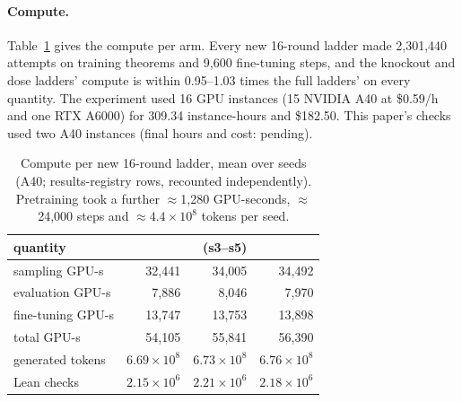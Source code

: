 \paragraph{Compute.} Table~\ref{tab:compute} gives the compute per arm. Every new 16-round ladder made 2,301,440 attempts
on training theorems and 9,600 fine-tuning steps, and the knockout and dose ladders' compute is within 0.95--1.03 times
the full ladders' on every quantity. The experiment used 16 GPU instances (15 NVIDIA A40 at \$0.59/h and one RTX A6000)
for 309.34 instance-hours and \$182.50. This paper's checks used two A40 instances (final hours and cost: pending).

\begin{table}[h]
\centering\small
\caption{Compute per new 16-round ladder, mean over seeds (A40; results-registry rows, recounted independently).
Pretraining took a further $\approx$1,280 GPU-seconds, $\approx$24,000 steps and $\approx 4.4\times10^8$ tokens per
seed.}
\label{tab:compute}
\begin{tabular}{lrrr}
\toprule
quantity & \Kko{} & \Kfull{} (s3--s5) & \Kdose{} \\
\midrule
sampling GPU-s & 32,441 & 34,005 & 34,492 \\
evaluation GPU-s & 7,886 & 8,046 & 7,970 \\
fine-tuning GPU-s & 13,747 & 13,753 & 13,898 \\
total GPU-s & 54,105 & 55,841 & 56,390 \\
generated tokens & $6.69\times10^8$ & $6.73\times10^8$ & $6.76\times10^8$ \\
Lean checks & $2.15\times10^6$ & $2.21\times10^6$ & $2.18\times10^6$ \\
\bottomrule
\end{tabular}
\end{table}
